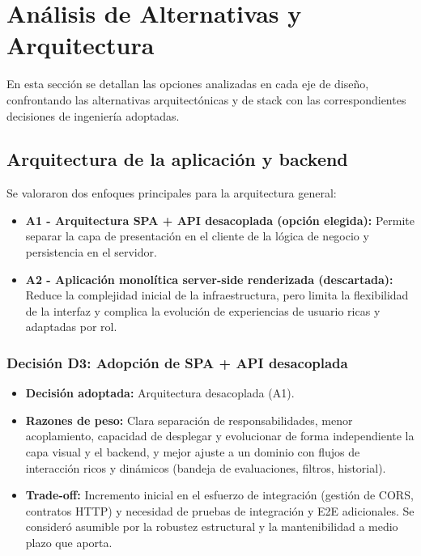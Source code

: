 \FloatBarrier
\section{An\'alisis de Alternativas y Arquitectura}

En esta secci\'on se detallan las opciones analizadas en cada eje de dise\~no, confrontando las alternativas arquitect\'onicas y de stack con las correspondientes decisiones de ingenier\'ia adoptadas.

\subsection{Arquitectura de la aplicaci\'on y backend}

Se valoraron dos enfoques principales para la arquitectura general:
\begin{itemize}
    \item \textbf{A1 - Arquitectura SPA + API desacoplada (opci\'on elegida):} Permite separar la capa de presentaci\'on en el cliente de la l\'ogica de negocio y persistencia en el servidor.
    \item \textbf{A2 - Aplicaci\'on monol\'itica server-side renderizada (descartada):} Reduce la complejidad inicial de la infraestructura, pero limita la flexibilidad de la interfaz y complica la evoluci\'on de experiencias de usuario ricas y adaptadas por rol.
\end{itemize}

\subsubsection*{Decisi\'on D3: Adopci\'on de SPA + API desacoplada}
\begin{itemize}
    \item \textbf{Decisi\'on adoptada:} Arquitectura desacoplada (A1).
    \item \textbf{Razones de peso:} Clara separaci\'on de responsabilidades, menor acoplamiento, capacidad de desplegar y evolucionar de forma independiente la capa visual y el backend, y mejor ajuste a un dominio con flujos de interacci\'on ricos y din\'amicos (bandeja de evaluaciones, filtros, historial).
    \item \textbf{Trade-off:} Incremento inicial en el esfuerzo de integraci\'on (gesti\'on de CORS, contratos HTTP) y necesidad de pruebas de integraci\'on y E2E adicionales. Se consider\'o asumible por la robustez estructural y la mantenibilidad a medio plazo que aporta.
\end{itemize}

